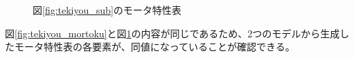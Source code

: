 \begin{figure}[t]
	\centering
	\caption{図\ref{fig:tekiyou_sub}のモータ特性表}
	\label{fig:sub_mortoku}
\end{figure}

図\ref{fig:tekiyou_mortoku}と図\ref{fig:sub_mortoku}の内容が同じであるため、2つのモデルから生成したモータ特性表の各要素が、同値になっていることが確認できる。

